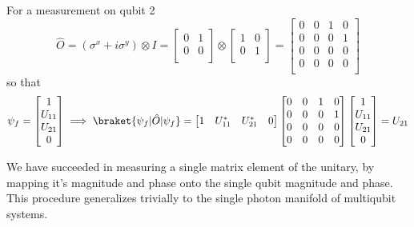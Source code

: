 For a measurement on qubit 2
\begin{equation}
    \hat{O}=(\sigma^{x} + i\sigma^{y}) \otimes I=
    \begin{bmatrix}
        0 & 1\\
        0 & 0\\
    \end{bmatrix}
    \otimes
    \begin{bmatrix}
        1 & 0\\
        0 & 1\\
    \end{bmatrix}
    =
    \begin{bmatrix}
        0 & 0 & 1 & 0\\
        0 & 0 & 0 & 1\\
        0 & 0 & 0 & 0\\
        0 & 0 & 0 & 0\\
    \end{bmatrix}
\end{equation}
so that
\begin{equation}
    \psi_{f}=
    \begin{bmatrix}
        1 \\
        U_{11} \\
        U_{21} \\
        0 \\
    \end{bmatrix}
    \implies
    \braket{\psi_{f}|\hat{O}|\psi_{f}} =
    \begin{bmatrix}
        1 & U_{11}^{*} & U_{21}^{*} & 0
    \end{bmatrix}
    \begin{bmatrix}
        0 & 0 & 1 & 0\\
        0 & 0 & 0 & 1\\
        0 & 0 & 0 & 0\\
        0 & 0 & 0 & 0\\
    \end{bmatrix}
    \begin{bmatrix}
        1 \\
        U_{11} \\
        U_{21} \\
        0 \\
    \end{bmatrix}
    = U_{21}
\end{equation}

We have succeeded in measuring a single matrix element of the unitary, by mapping it's magnitude and phase onto the single qubit magnitude and phase.
This procedure generalizes trivially to the single photon manifold of multiqubit systems.
